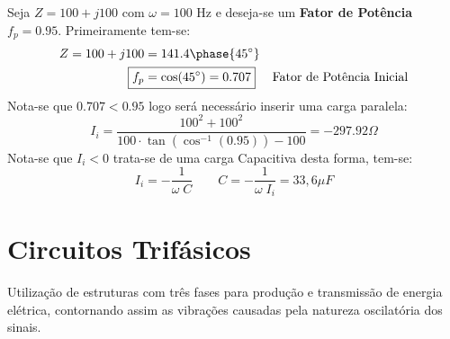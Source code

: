 \documentclass{article}
\begin{document}
                    \begin{example}
                        Seja $Z = 100 + j100$ com $\omega = 100$ Hz e deseja-se um \textbf{Fator de Potência} $f_{p} = 0.95$. Primeiramente tem-se:
                            \begin{align*}
                                Z = 100 + j100 &= 141.4\phase{45^{\circ}}\\
                                \Aboxed{
                                    f_{p} &= \cos(45^{\circ}) = 0.707
                                } & \text{Fator de Potência Inicial}
                            \end{align*}
                        Nota-se que $0.707 < 0.95$ logo será necessário inserir uma carga paralela:
                            \begin{equation*}
                                I_{i} = \frac{100^2 + 100^2}{100\cdot\tan(\cos^{-1}(0.95)) - 100} = -297.92 \Omega
                            \end{equation*}
                        Nota-se que $I_{i} < 0$ trata-se de uma carga Capacitiva desta forma, tem-se: 
                            \begin{equation*}
                                I_{i} = -\frac{1}{\omega\;C}
                                \qquad
                                \boxed{
                                    C = - \frac{1}{\omega\;I_{i}} = 33,6 \mu F
                                }
                            \end{equation*}
                    \end{example}

    \section{Circuitos Trifásicos}
        \begin{definition}
            Utilização de estruturas com três fases para produção e transmissão de energia elétrica, contornando assim as vibrações causadas pela natureza oscilatória dos sinais.
        \end{definition}
\end{document}
